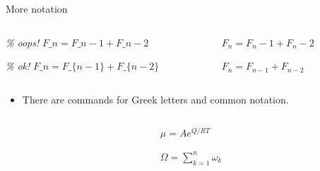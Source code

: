 \documentclass[,aspectratio=43]{beamer}
\newenvironment{Shaded}{\begin{snugshade}}{\end{snugshade}}
\newcommand{\CommentTok}[1]{\textcolor[rgb]{0.38,0.63,0.69}{\textit{#1}}}
\newcommand{\SpecialCharTok}[1]{\textcolor[rgb]{0.25,0.44,0.63}{#1}}
\newcommand{\SpecialStringTok}[1]{\textcolor[rgb]{0.73,0.40,0.53}{#1}}
\providecommand{\tightlist}{%
  \setlength{\itemsep}{0pt}\setlength{\parskip}{0pt}}
\begin{document}
\begin{frame}[fragile]{More notation}
\begin{columns}[T]
\begin{column}{0.58\textwidth}
\begin{Shaded}
\begin{Highlighting}[]
\CommentTok{\% oops!}
\SpecialStringTok{$F\_n = F\_n{-}1 + F\_n{-}2$} 

\CommentTok{\% ok!}
\SpecialStringTok{$F\_n = F\_\{n{-}1\} + F\_\{n{-}2\}$}
\end{Highlighting}
\end{Shaded}
\end{column}

\begin{column}{0.38\textwidth}
\vspace{1em}

\(F_n = F_n-1 + F_n-2\)

\vspace{2em}

\(F_n = F_{n-1} + F_{n-2}\)
\end{column}
\end{columns}

\vspace{0.5em}

\begin{itemize}
\tightlist
\item
  There are commands for Greek letters and common notation.
\end{itemize}

\begin{columns}[T]
\begin{column}{0.58\textwidth}
\small
\vspace{-1em}

\begin{Shaded}
\end{Shaded}
\end{column}

\begin{column}{0.38\textwidth}
\(\mu = A e^{Q/RT}\)

\vspace{1em}

\(\Omega = \sum_{k=1}^{n} \omega_k\)
\end{column}
\end{columns}
\end{frame}
\end{document}
